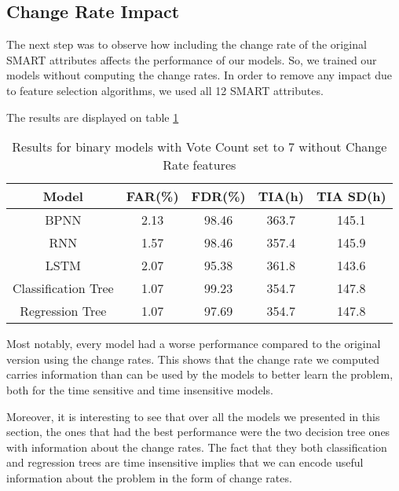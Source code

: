 \subsection{Change Rate Impact}\label{subsec:change_rate_impact}

The next step was to observe how including the change rate of the original SMART attributes affects the performance of our models.
So, we trained our models without computing the change rates.
In order to remove any impact due to feature selection algorithms, we used all 12 SMART attributes.

The results are displayed on table \ref{table:results_binary_no_change_rate}

\begin{table}
  \begin{center}
    \begin{tabular}{|c|c|c|c|c|}
      \hline
    Model & FAR(\%) & FDR(\%) & TIA(h) & TIA SD(h) \\
    \hline
    BPNN & 2.13 & 98.46 & 363.7 & 145.1 \\
    RNN & 1.57 & 98.46 & 357.4 & 145.9 \\
    LSTM & 2.07 & 95.38 & 361.8 & 143.6 \\
    Classification Tree & 1.07 & 99.23 & 354.7 & 147.8 \\
    Regression Tree & 1.07 & 97.69 & 354.7 & 147.8 \\
    \hline
    \end{tabular}
    \caption[Results Binary Models with Voting, no Change Rate]{Results for binary models with Vote Count set to 7 without Change Rate features}
    \label{table:results_binary_no_change_rate}
  \end{center}
\end{table}

Most notably, every model had a worse performance compared to the original version using the change rates.
This shows that the change rate we computed carries information than can be used by the models to better learn the problem, both for the time sensitive and time insensitive models.

Moreover, it is interesting to see that over all the models we presented in this section, the ones that had the best performance were the two decision tree ones with information about the change rates.
The fact that they both classification and regression trees are time insensitive implies that we can encode useful information about the problem in the form of change rates. 

